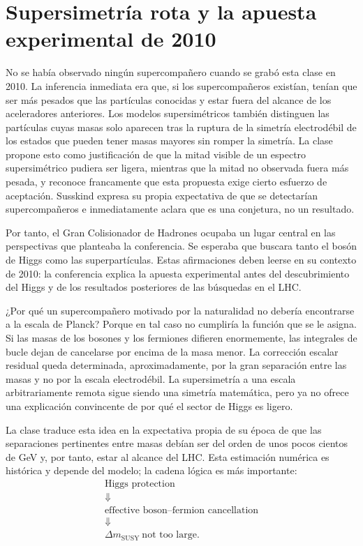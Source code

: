 \section{Supersimetría rota y la apuesta experimental de 2010}

No se había observado ningún supercompañero cuando se grabó esta clase en 2010. La inferencia inmediata era que, si los supercompañeros existían, tenían que ser más pesados que las partículas conocidas y estar fuera del alcance de los aceleradores anteriores. Los modelos supersimétricos también distinguen las partículas cuyas masas solo aparecen tras la ruptura de la simetría electrodébil de los estados que pueden tener masas mayores sin romper la simetría. La clase propone esto como justificación de que la mitad visible de un espectro supersimétrico pudiera ser ligera, mientras que la mitad no observada fuera más pesada, y reconoce francamente que esta propuesta exige cierto esfuerzo de aceptación. Susskind expresa su propia expectativa de que se detectarían supercompañeros e inmediatamente aclara que es una conjetura, no un resultado.

Por tanto, el Gran Colisionador de Hadrones ocupaba un lugar central en las perspectivas que planteaba la conferencia. Se esperaba que buscara tanto el bosón de Higgs como las superpartículas. Estas afirmaciones deben leerse en su contexto de 2010: la conferencia explica la apuesta experimental antes del descubrimiento del Higgs y de los resultados posteriores de las búsquedas en el LHC.

¿Por qué un supercompañero motivado por la naturalidad no debería encontrarse a la escala de Planck? Porque en tal caso no cumpliría la función que se le asigna. Si las masas de los bosones y los fermiones difieren enormemente, las integrales de bucle dejan de cancelarse por encima de la masa menor. La corrección escalar residual queda determinada, aproximadamente, por la gran separación entre las masas y no por la escala electrodébil. La supersimetría a una escala arbitrariamente remota sigue siendo una simetría matemática, pero ya no ofrece una explicación convincente de por qué el sector de Higgs es ligero.

La clase traduce esta idea en la expectativa propia de su época de que las separaciones pertinentes entre masas debían ser del orden de unos pocos cientos de GeV y, por tanto, estar al alcance del LHC. Esta estimación numérica es histórica y depende del modelo; la cadena lógica es más importante:
\begin{equation}
\begin{gathered}
\text{Higgs protection}\\
\Downarrow\\
\text{effective boson--fermion cancellation}\\
\Downarrow\\
\Delta m_{\mathrm{SUSY}}\ \text{not too large}.
\end{gathered}
\end{equation}

